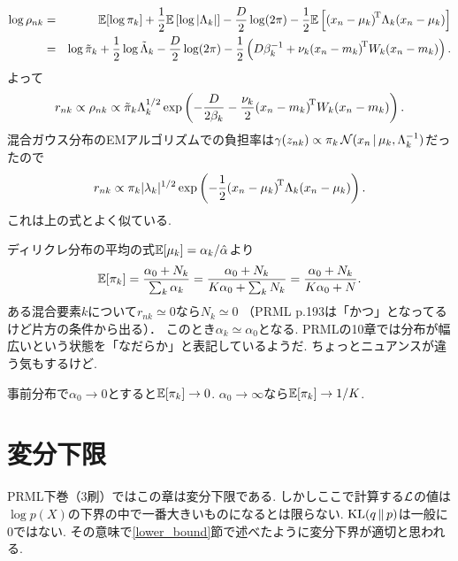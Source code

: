 \begin{eqnarray*}
\log \rho_{nk}
 &=& \mathbb{E}[\log \pi_k] + \frac{1}{2} \mathbb{E}\left[\log |\Lambda_k|\right]-\frac{D}{2}\log (2\pi)-\frac{1}{2} \mathbb{E}\left[{(x_n-\mu_k)}^{\!\mathrm{T}} \Lambda_k {(x_n-\mu_k)}\right]\\
 &=& \log \tilde{\pi}_k + \frac{1}{2}\log \tilde{\Lambda}_k
       - \frac{D}{2}\log (2\pi)-\frac{1}{2}\left(D\beta_k^{-1}+\nu_k{(x_n-m_k)}^{\!\mathrm{T}} W_k {(x_n-m_k)}\right).
\end{eqnarray*}
よって
$$
r_{nk} \propto \rho_{nk} \propto \tilde{\pi}_k \Lambda_k^{1/2} \exp\left(-\frac{D}{2\beta_k} - \frac{\nu_k}{2}{(x_n-m_k)}^{\!\mathrm{T}} W_k {(x_n-m_k)}\right).
$$
混合ガウス分布のEMアルゴリズムでの負担率は$\gamma(z_{nk}) \propto \pi_k\,{\cal N}(x_n\,|\,\mu_k, \Lambda_k^{-1})$だったので
$$
r_{nk} \propto \pi_k|\lambda_k|^{1/2} \exp \left(-\frac{1}{2}{(x_n-\mu_k)}^{\!\mathrm{T}} \Lambda_k {(x_n-\mu_k)}\right).
$$
これは上の式とよく似ている.

ディリクレ分布の平均の式$\mathbb{E}[\mu_k]=\alpha_k/\hat{\alpha}$より
$$
\mathbb{E}[\pi_k]=\frac{\alpha_0 + N_k}{\sum_k \alpha_k}=\frac{\alpha_0 + N_k}{K\alpha_0 + \sum_k N_k} = \frac{\alpha_0 + N_k}{K \alpha_0 + N}.
$$
ある混合要素$k$について$r_{nk} \simeq 0$なら$N_k \simeq 0$%
（PRML p.193は「かつ」となってるけど片方の条件から出る）．
このとき$\alpha_k \simeq \alpha_0$となる. PRMLの10章では分布が幅広いという状態を「なだらか」と表記しているようだ.
ちょっとニュアンスが違う気もするけど.

事前分布で$\alpha_0 \rightarrow 0$とすると$\mathbb{E}[\pi_k] \rightarrow 0$.
$\alpha_0 \rightarrow \infty$なら$\mathbb{E}[\pi_k] \rightarrow 1/K$.

\section{変分下限}
PRML下巻（3刷）ではこの章は変分下限である.
しかしここで計算する${\cal L}$の値は$\log p(X)$の下界の中で一番大きいものになるとは限らない.
$\mathop{\mathrm{KL}}\nolimits(q\,\|\,p)$は一般に$0$ではない.
その意味で\ref{lower_bound}節で述べたように変分下界が適切と思われる.

